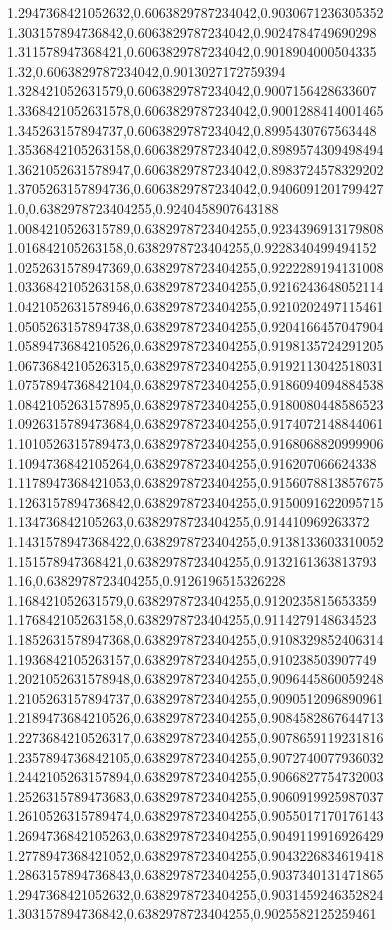 1.2947368421052632,0.6063829787234042,0.9030671236305352
1.303157894736842,0.6063829787234042,0.9024784749690298
1.311578947368421,0.6063829787234042,0.9018904000504335
1.32,0.6063829787234042,0.9013027172759394
1.328421052631579,0.6063829787234042,0.9007156428633607
1.3368421052631578,0.6063829787234042,0.9001288414001465
1.345263157894737,0.6063829787234042,0.8995430767563448
1.3536842105263158,0.6063829787234042,0.8989574309498494
1.3621052631578947,0.6063829787234042,0.8983724578329202
1.3705263157894736,0.6063829787234042,0.9406091201799427
1.0,0.6382978723404255,0.9240458907643188
1.0084210526315789,0.6382978723404255,0.9234396913179808
1.016842105263158,0.6382978723404255,0.9228340499494152
1.0252631578947369,0.6382978723404255,0.9222289194131008
1.0336842105263158,0.6382978723404255,0.9216243648052114
1.0421052631578946,0.6382978723404255,0.9210202497115461
1.0505263157894738,0.6382978723404255,0.9204166457047904
1.0589473684210526,0.6382978723404255,0.9198135724291205
1.0673684210526315,0.6382978723404255,0.9192113042518031
1.0757894736842104,0.6382978723404255,0.9186094094884538
1.0842105263157895,0.6382978723404255,0.9180080448586523
1.0926315789473684,0.6382978723404255,0.9174072148844061
1.1010526315789473,0.6382978723404255,0.9168068820999906
1.1094736842105264,0.6382978723404255,0.916207066624338
1.1178947368421053,0.6382978723404255,0.9156078813857675
1.1263157894736842,0.6382978723404255,0.9150091622095715
1.134736842105263,0.6382978723404255,0.914410969263372
1.1431578947368422,0.6382978723404255,0.9138133603310052
1.151578947368421,0.6382978723404255,0.9132161363813793
1.16,0.6382978723404255,0.9126196515326228
1.168421052631579,0.6382978723404255,0.9120235815653359
1.176842105263158,0.6382978723404255,0.9114279148634523
1.1852631578947368,0.6382978723404255,0.9108329852406314
1.1936842105263157,0.6382978723404255,0.910238503907749
1.2021052631578948,0.6382978723404255,0.9096445860059248
1.2105263157894737,0.6382978723404255,0.9090512096890961
1.2189473684210526,0.6382978723404255,0.9084582867644713
1.2273684210526317,0.6382978723404255,0.9078659119231816
1.2357894736842105,0.6382978723404255,0.9072740077936032
1.2442105263157894,0.6382978723404255,0.9066827754732003
1.2526315789473683,0.6382978723404255,0.9060919925987037
1.2610526315789474,0.6382978723404255,0.9055017170176143
1.2694736842105263,0.6382978723404255,0.9049119916926429
1.2778947368421052,0.6382978723404255,0.9043226834619418
1.2863157894736843,0.6382978723404255,0.9037340131471865
1.2947368421052632,0.6382978723404255,0.9031459246352824
1.303157894736842,0.6382978723404255,0.9025582125259461

